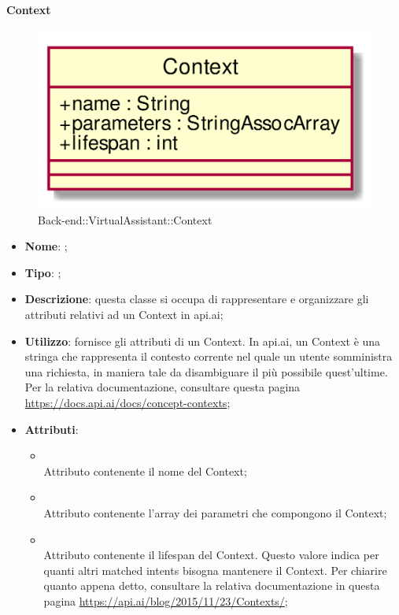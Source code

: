 \hypertarget{Context_label}{\paragraph{Context}}
\begin{figure}[h]
	\centering
	\includegraphics[width=\textwidth,height=\textheight,keepaspectratio]{images/ClassContext.png}
	\caption{Back-end::VirtualAssistant::Context}
\end{figure}
\begin{itemize}
	\item \textbf{Nome}: ;
	\item \textbf{Tipo}: ;
	\item \textbf{Descrizione}: questa classe si occupa di rappresentare e organizzare gli attributi relativi ad un Context in api.ai;
	\item \textbf{Utilizzo}: fornisce gli attributi di un Context.
In api.ai, un Context è una stringa che rappresenta il contesto corrente nel quale un utente somministra una richiesta, in maniera tale da disambiguare il più possibile quest'ultime. \\
Per la relativa documentazione, consultare questa pagina \url{https://docs.api.ai/docs/concept-contexts};
	\item \textbf{Attributi}:
	\begin{itemize}
		\item[]  \\
		Attributo contenente il nome del Context;
		\item[]  \\
		Attributo contenente l'array dei parametri che compongono il Context;
		\item[]  \\
		Attributo contenente il lifespan del Context.
Questo valore indica per quanti altri matched intents bisogna mantenere il Context.
Per chiarire quanto appena detto, consultare la relativa documentazione in questa pagina \url{https://api.ai/blog/2015/11/23/Contexts/};
	\end{itemize}
\end{itemize}

